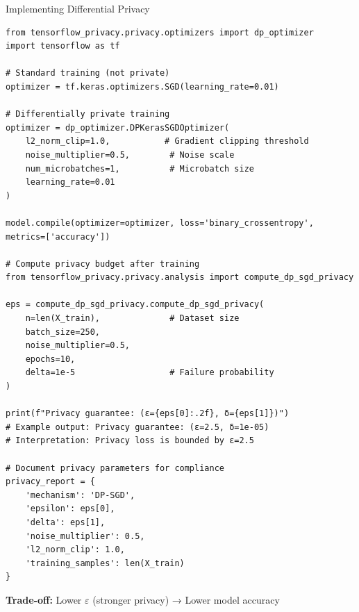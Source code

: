 \begin{frame}[fragile]{Implementing Differential Privacy}
\begin{lstlisting}[basicstyle=\ttfamily\tiny]
from tensorflow_privacy.privacy.optimizers import dp_optimizer
import tensorflow as tf

# Standard training (not private)
optimizer = tf.keras.optimizers.SGD(learning_rate=0.01)

# Differentially private training
optimizer = dp_optimizer.DPKerasSGDOptimizer(
    l2_norm_clip=1.0,           # Gradient clipping threshold
    noise_multiplier=0.5,        # Noise scale
    num_microbatches=1,          # Microbatch size
    learning_rate=0.01
)

model.compile(optimizer=optimizer, loss='binary_crossentropy', metrics=['accuracy'])

# Compute privacy budget after training
from tensorflow_privacy.privacy.analysis import compute_dp_sgd_privacy

eps = compute_dp_sgd_privacy.compute_dp_sgd_privacy(
    n=len(X_train),              # Dataset size
    batch_size=250,
    noise_multiplier=0.5,
    epochs=10,
    delta=1e-5                   # Failure probability
)

print(f"Privacy guarantee: (ε={eps[0]:.2f}, δ={eps[1]})")
# Example output: Privacy guarantee: (ε=2.5, δ=1e-05)
# Interpretation: Privacy loss is bounded by ε=2.5

# Document privacy parameters for compliance
privacy_report = {
    'mechanism': 'DP-SGD',
    'epsilon': eps[0],
    'delta': eps[1],
    'noise_multiplier': 0.5,
    'l2_norm_clip': 1.0,
    'training_samples': len(X_train)
}
\end{lstlisting}

\textbf{Trade-off:} Lower $\varepsilon$ (stronger privacy) → Lower model accuracy
\end{frame}


